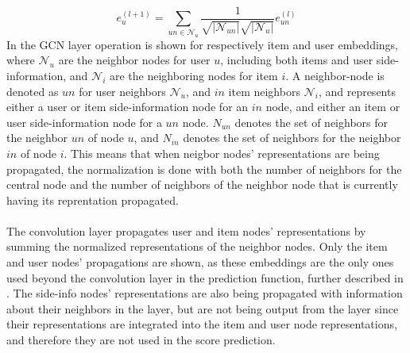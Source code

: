 \begin{equation}\label{eq:csgcn_is_gc_layer_user}
     e_{u}^{(l+1)}=\sum_{un\in \mathcal{N}_{u}}\frac{1}{\sqrt{|\mathcal{N}_{un}|} \sqrt{|\mathcal{N}_{u}|}}e_{un}^{(l)}
\end{equation}
In  the GCN layer operation is shown for respectively item and user embeddings, where $\mathcal{N}_{u}$ are the neighbor nodes for user $u$, including both items and user side-information, and $\mathcal{N}_{i}$ are the neighboring nodes for item $i$. 
A neighbor-node is denoted as $un$ for user neighbors $\mathcal{N}_{u}$, and $in$ item neighbors $\mathcal{N}_{i}$, and represents either a user or item side-information node for an $in$ node, and either an item or user side-information node for a $un$ node.
$N_{un}$ denotes the set of neighbors for the neighbor $un$ of node $u$, and $N_{in}$ denotes the set of neighbors for the neighbor $in$ of node $i$.
This means that when neigbor nodes' representations are being propagated, the normalization is done with both the number of neighbors for the central node and the number of neighbors of the neighbor node that is currently having its reprentation propagated.
\\\\
The convolution layer propagates user and item nodes' representations by summing the normalized representations of the neighbor nodes.
Only the item and user nodes' propagations are shown, as these embeddings are the only ones used beyond the convolution layer in the prediction function, further described in .
The side-info nodes' representations are also being propagated with information about their neighbors in the layer, but are not being output from the layer since their representations are integrated into the item and user node representations, and therefore they are not used in the score prediction.


